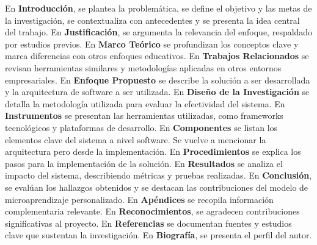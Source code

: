 En \textbf{Introducción}, se plantea la problemática, se define el objetivo y las metas de la investigación, se contextualiza con antecedentes y se presenta la idea central del trabajo.
En \textbf{Justificación}, se argumenta la relevancia del enfoque, respaldado por estudios previos.
En \textbf{Marco Teórico} se profundizan los conceptos clave y marca diferencias con otros enfoques educativos.
En \textbf{Trabajos Relacionados} se revisan herramientas similares y metodologías aplicadas en otros entornos empresariales.
En \textbf{Enfoque Propuesto} se describe la solución a ser desarrollada y la arquitectura de software a ser utilizada.
En \textbf{Diseño de la Investigación} se detalla la metodología utilizada para evaluar la efectividad del sistema.
En \textbf{Instrumentos} se presentan las herramientas utilizadas, como frameworks tecnológicos y plataformas de desarrollo.
En \textbf{Componentes} se listan los elementos clave del sistema a nivel software. Se vuelve a mencionar la arquitectura pero desde la implementación.
En \textbf{Procedimientos} se explica los pasos para la implementación de la solución.
En \textbf{Resultados} se analiza el impacto del sistema, describiendo métricas y pruebas realizadas.
En \textbf{Conclusión}, se evalúan los hallazgos obtenidos y se destacan las contribuciones del modelo de microaprendizaje personalizado.
En \textbf{Apéndices} se recopila información complementaria relevante.
En \textbf{Reconocimientos}, se agradecen contribuciones significativas al proyecto.
En \textbf{Referencias} se documentan fuentes y estudios clave que sustentan la investigación.
En \textbf{Biografía}, se presenta el perfil del autor.